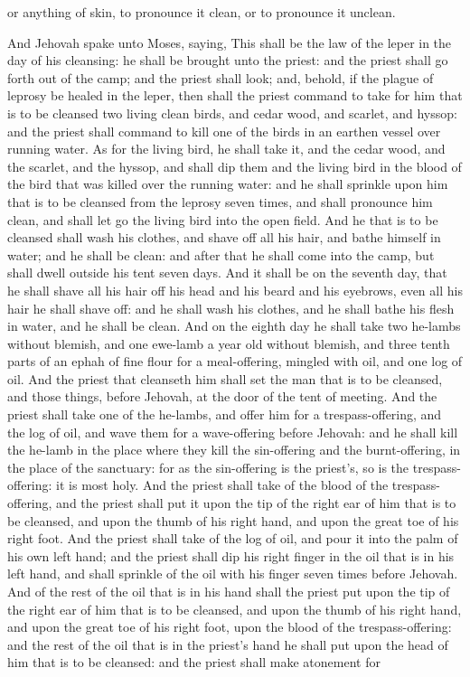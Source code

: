 or anything of skin, to pronounce it clean, or to pronounce it unclean. 

And Jehovah spake unto Moses, saying, This shall be the law of the leper in the day of his cleansing: he shall be brought unto the priest: and the priest shall go forth out of the camp; and the priest shall look; and, behold, if the plague of leprosy be healed in the leper, then shall the priest command to take for him that is to be cleansed two living clean birds, and cedar wood, and scarlet, and hyssop: and the priest shall command to kill one of the birds in an earthen vessel over running water. As for the living bird, he shall take it, and the cedar wood, and the scarlet, and the hyssop, and shall dip them and the living bird in the blood of the bird that was killed over the running water: and he shall sprinkle upon him that is to be cleansed from the leprosy seven times, and shall pronounce him clean, and shall let go the living bird into the open field. And he that is to be cleansed shall wash his clothes, and shave off all his hair, and bathe himself in water; and he shall be clean: and after that he shall come into the camp, but shall dwell outside his tent seven days. And it shall be on the seventh day, that he shall shave all his hair off his head and his beard and his eyebrows, even all his hair he shall shave off: and he shall wash his clothes, and he shall bathe his flesh in water, and he shall be clean.  And on the eighth day he shall take two he-lambs without blemish, and one ewe-lamb a year old without blemish, and three tenth parts of an ephah of fine flour for a meal-offering, mingled with oil, and one log of oil. And the priest that cleanseth him shall set the man that is to be cleansed, and those things, before Jehovah, at the door of the tent of meeting. And the priest shall take one of the he-lambs, and offer him for a trespass-offering, and the log of oil, and wave them for a wave-offering before Jehovah: and he shall kill the he-lamb in the place where they kill the sin-offering and the burnt-offering, in the place of the sanctuary: for as the sin-offering is the priest’s, so is the trespass-offering: it is most holy. And the priest shall take of the blood of the trespass-offering, and the priest shall put it upon the tip of the right ear of him that is to be cleansed, and upon the thumb of his right hand, and upon the great toe of his right foot. And the priest shall take of the log of oil, and pour it into the palm of his own left hand; and the priest shall dip his right finger in the oil that is in his left hand, and shall sprinkle of the oil with his finger seven times before Jehovah. And of the rest of the oil that is in his hand shall the priest put upon the tip of the right ear of him that is to be cleansed, and upon the thumb of his right hand, and upon the great toe of his right foot, upon the blood of the trespass-offering: and the rest of the oil that is in the priest’s hand he shall put upon the head of him that is to be cleansed: and the priest shall make atonement for 